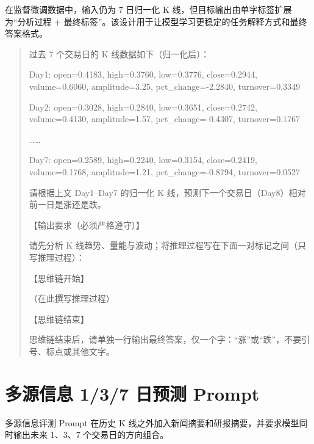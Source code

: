 在监督微调数据中，输入仍为 7 日归一化 K 线，但目标输出由单字标签扩展为“分析过程 + 最终标签”。该设计用于让模型学习更稳定的任务解释方式和最终答案格式。

\begin{quote}\small
过去 7 个交易日的 K 线数据如下（归一化后）：

Day1: open=0.4183, high=0.3760, low=0.3776, close=0.2944, volume=0.6060, amplitude=3.25, pct\_change=-2.2840, turnover=0.3349

Day2: open=0.3028, high=0.2840, low=0.3651, close=0.2742, volume=0.4130, amplitude=1.57, pct\_change=-0.4307, turnover=0.1767

……

Day7: open=0.2589, high=0.2240, low=0.3154, close=0.2419, volume=0.1768, amplitude=1.21, pct\_change=-0.8794, turnover=0.0527

请根据上文 Day1--Day7 的归一化 K 线，预测下一个交易日（Day8）相对前一日是涨还是跌。

【输出要求（必须严格遵守）】

请先分析 K 线趋势、量能与波动；将推理过程写在下面一对标记之间（只写推理过程）：

【思维链开始】

（在此撰写推理过程）

【思维链结束】

思维链结束后，请单独一行输出最终答案，仅一个字：“涨”或“跌”，不要引号、标点或其他文字。
\end{quote}

\section{多源信息 1/3/7 日预测 Prompt}

多源信息评测 Prompt 在历史 K 线之外加入新闻摘要和研报摘要，并要求模型同时输出未来 1、3、7 个交易日的方向组合。

